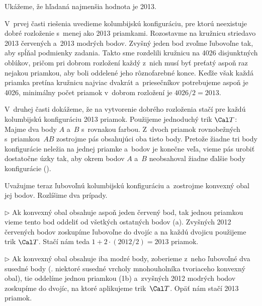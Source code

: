 {%
Ukážeme, že hľadaná najmenšia hodnota je 2013.

\smallskip
V~prvej časti riešenia uvedieme kolumbijskú konfiguráciu, pre ktorú neexistuje dobré rozloženie s~menej ako 2013 priamkami. Rozostavme na kružnicu striedavo 2013 červených a~2013 modrých bodov. Zvyšný jeden bod zvoľme ľubovoľne tak, aby spĺňal podmienky zadania. Takto sme rozdelili kružnicu na 4026 disjunktných oblúkov, pričom pri dobrom rozložení každý z~nich musí byť preťatý aspoň raz nejakou priamkou, aby boli oddelené jeho rôznofarebné konce. Keďže však každá priamka pretína kružnicu najviac dvakrát a~priesečníkov potrebujeme aspoň je 4026, minimálny počet priamok v~dobrom rozložení je $4026/2 = 2013$.

\smallskip
V~druhej časti dokážeme, že na vytvorenie dobrého rozloženia stačí pre každú kolumbijskú konfiguráciu 2013 priamok.
Použijeme jednoduchý trik $\Cal T$: Majme dva body $A$ a~$B$ s~rovnakou farbou. Z~dvoch priamok rovnobežných s~priamkou~$AB$ zostrojme pás obsahujúci oba tieto body. Pretože žiadne tri body konfigurácie neležia na jednej priamke a~bodov je konečne veľa, vieme pás urobiť dostatočne úzky tak, aby okrem bodov $A$ a~$B$ neobsahoval žiadne ďalšie body konfigurácie (\obr).
%

Uvažujme teraz ľubovoľnú kolumbijskú konfiguráciu a~zostrojme konvexný obal jej bodov. Rozlíšime dva prípady.
\item{$\triangleright$} Ak konvexný obal obsahuje aspoň jeden červený bod, tak jednou priamkou vieme tento bod oddeliť od všetkých ostatných bodov (\obr a). Zvyšných 2012 červených bodov zoskupíme ľubovoľne do dvojíc a na každú dvojicu použijeme trik $\Cal T$. Stačí nám teda $1 + 2\cdot(2012/2)=2013$ priamok.
\item{$\triangleright$} Ak konvexný obal obsahuje iba modré body, zoberieme z~neho ľubovoľné dva susedné body (\tj. niektoré susedné vrcholy mnohouholníka tvoriaceho konvexný obal), tie oddelíme jednou priamkou (\obrr1b) a~zvyšných 2012 modrých bodov zoskupíme do dvojíc, na ktoré aplikujeme trik~$\Cal T$. Opäť nám stačí 2013 priamok.
%
\endgraf
}

